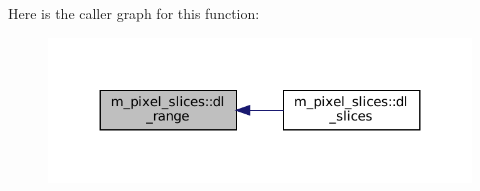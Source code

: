 Here is the caller graph for this function\+:\nopagebreak
\begin{figure}[H]
\begin{center}
\leavevmode
\includegraphics[width=324pt]{namespacem__pixel__slices_a47408b6c6411a3c3cb3419b319e57978_icgraph}
\end{center}
\end{figure}
\mbox{\label{namespacem__pixel__slices_af2848516f6507a3d0bcca92ff07ef40f}} 
